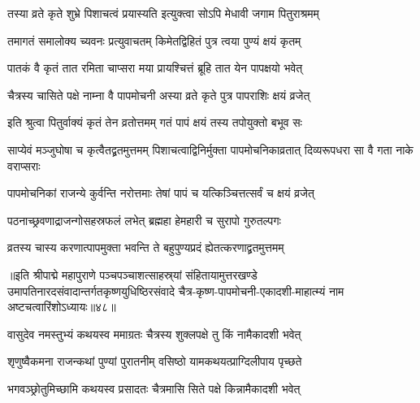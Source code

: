 \twolineshloka
{तस्या व्रते कृते शुभ्रे पिशाचत्वं प्रयास्यति}
{इत्युक्त्वा सोऽपि मेधावी जगाम पितुराश्रमम्}%

\twolineshloka
{तमागतं समालोक्य च्यवनः प्रत्युवाचतम्}
{किमेतद्विहितं पुत्र त्वया पुण्यं क्षयं कृतम्}%


\twolineshloka
{पातकं वै कृतं तात रमिता चाप्सरा मया}
{प्रायश्चित्तं ब्रूहि तात येन पापक्षयो भवेत्}%


\twolineshloka
{चैत्रस्य चासिते पक्षे नाम्ना वै पापमोचनी}
{अस्या व्रते कृते पुत्र पापराशिः क्षयं व्रजेत्}%

\twolineshloka
{इति श्रुत्वा पितुर्वाक्यं कृतं तेन व्रतोत्तमम्}
{गतं पापं क्षयं तस्य तपोयुक्तो बभूव सः}%

\threelineshloka
{साप्येवं मञ्जुघोषा च कृत्वैतद्व्रतमुत्तमम्}
{पिशाचत्वाद्विनिर्मुक्ता पापमोचनिकाव्रतात्}
{दिव्यरूपधरा सा वै गता नाके वराप्सराः}%


\twolineshloka
{पापमोचनिकां राजन्ये कुर्वन्ति नरोत्तमाः}
{तेषां पापं च यत्किञ्चित्तत्सर्वं च क्षयं व्रजेत्}%

\twolineshloka
{पठनाच्छ्रवणाद्राजन्गोसहस्रफलं लभेत्}
{ब्रह्महा हेमहारी च सुरापो गुरुतल्पगः}%

\twolineshloka
{व्रतस्य चास्य करणात्पापमुक्ता भवन्ति ते}
{बहुपुण्यप्रदं ह्येतत्करणाद्व्रतमुत्तमम्}%

॥इति श्रीपाद्मे महापुराणे पञ्चपञ्चाशत्साहस्र्यां संहितायामुत्तरखण्डे उमापतिनारदसंवादान्तर्गतकृष्णयुधिष्ठिरसंवादे चैत्र-कृष्ण-पापमोचनी-एकादशी-माहात्म्यं नाम अष्टचत्वारिंशोऽध्यायः॥४८॥


\hyperref[sec:ekadashi_mahatmyam_padma_puranam]{\closesub}
\clearpage

\label{sec:padma-chaitra-shukla-kamada}



\twolineshloka
{वासुदेव नमस्तुभ्यं कथयस्व ममाग्रतः}
{चैत्रस्य शुक्लपक्षे तु किं नामैकादशी भवेत्}%


\twolineshloka
{शृणुष्वैकमना राजन्कथां पुण्यां पुरातनीम्}
{वसिष्ठो यामकथयत्प्राग्दिलीपाय पृच्छते}%


\twolineshloka
{भगवञ्छ्रोतुमिच्छामि कथयस्व प्रसादतः}
{चैत्रमासि सिते पक्षे किन्नामैकादशी भवेत्}%

